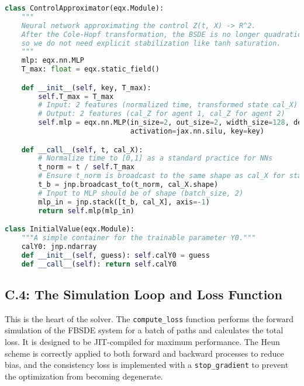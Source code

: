 \documentclass[11pt,letterpaper,oneside]{article}
\theoremstyle{plain}
\theoremstyle{definition}
\theoremstyle{remark}
\begin{document}
\begin{lstlisting}[language=Python, caption={C.3: Equinox Modules for the Deep BSDE Solver (Post Cole-Hopf).}, label={lst:equinox_mlp_app_appendix}]
class ControlApproximator(eqx.Module):
    """
    Neural network approximating the control Z(t, X) -> R^2.
    After the Cole-Hopf transformation, the BSDE is no longer quadratic,
    so we do not need explicit stabilization like tanh saturation.
    """
    mlp: eqx.nn.MLP
    T_max: float = eqx.static_field()

    def __init__(self, key, T_max):
        self.T_max = T_max
        # Input: 2 features (normalized time, transformed state cal_X)
        # Output: 2 features (cal_Z for agent 1, cal_Z for agent 2)
        self.mlp = eqx.nn.MLP(in_size=2, out_size=2, width_size=128, depth=3, 
                              activation=jax.nn.silu, key=key)

    def __call__(self, t, cal_X):
        # Normalize time to [0,1] as a standard practice for NNs
        t_norm = t / self.T_max
        # Ensure t_norm is broadcast to the same shape as cal_X for stacking
        t_b = jnp.broadcast_to(t_norm, cal_X.shape)
        # Input to MLP should be of shape (batch_size, 2)
        mlp_in = jnp.stack([t_b, cal_X], axis=-1)
        return self.mlp(mlp_in)

class InitialValue(eqx.Module):
    """A simple container for the trainable parameter Y0."""
    calY0: jnp.ndarray
    def __init__(self, guess): self.calY0 = guess
    def __call__(self): return self.calY0
\end{lstlisting}

\subsection{C.4: The Simulation Loop and Loss Function}
This is the heart of the solver. The \texttt{compute\_loss} function performs the forward simulation of the FBSDE system for a batch of paths and calculates the total loss. It is designed to be JIT-compiled for maximum performance. The Heun scheme is correctly applied to both forward and backward processes to reduce bias, and the consistency loss is implemented with a \texttt{stop\_gradient} to prevent the optimization from becoming degenerate.
\end{document}
